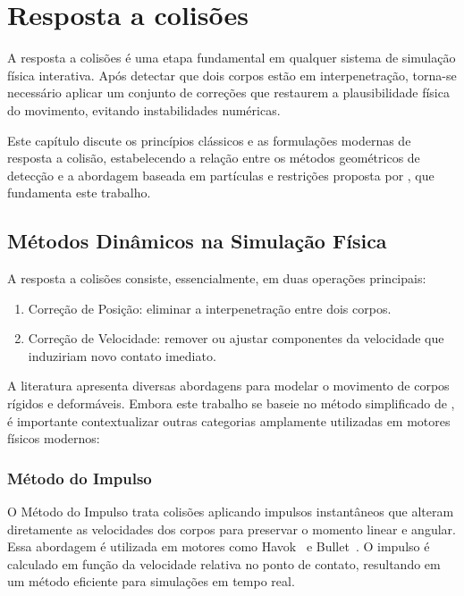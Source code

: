 \chapter{Resposta a colisões}

A resposta a colisões é uma etapa fundamental em qualquer sistema de simulação física interativa. Após detectar que dois corpos estão em interpenetração, torna-se necessário aplicar um conjunto de correções que restaurem a plausibilidade física do movimento, evitando instabilidades numéricas. 

Este capítulo discute os princípios clássicos e as formulações modernas de resposta a colisão, estabelecendo a relação entre os métodos geométricos de detecção e a abordagem baseada em partículas e restrições proposta por , que fundamenta este trabalho.

\section{Métodos Dinâmicos na Simulação Física}

A resposta a colisões consiste, essencialmente, em duas operações principais:
\begin{enumerate}
	\item Correção de Posição: eliminar a interpenetração entre dois corpos.
	\item Correção de Velocidade: remover ou ajustar componentes da velocidade que induziriam novo contato imediato.
\end{enumerate}
A literatura apresenta diversas abordagens para modelar o movimento de corpos rígidos e deformáveis. Embora este trabalho se baseie no método simplificado de , é importante contextualizar outras categorias amplamente utilizadas em motores físicos modernos:

\subsection*{Método do Impulso}

O Método do Impulso trata colisões aplicando impulsos instantâneos que alteram diretamente as velocidades dos corpos para preservar o momento linear e angular. Essa abordagem é utilizada em motores como Havok~\cite{havok_physics} e Bullet~\cite{bullet_physics}. O impulso é calculado em função da velocidade relativa no ponto de contato, resultando em um método eficiente para simulações em tempo real.

